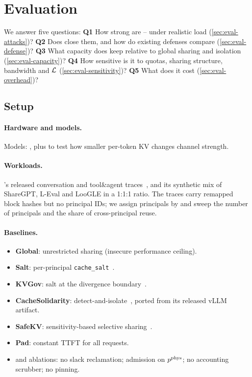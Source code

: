 \section{Evaluation}
\label{sec:eval}

We answer five questions:
\textbf{Q1} How strong are -- under realistic load (\cref{sec:eval-attacks})?
\textbf{Q2} Does \sys close them, and how do existing defenses compare (\cref{sec:eval-defense})?
\textbf{Q3} What capacity does \sys keep relative to global sharing and isolation (\cref{sec:eval-capacity})?
\textbf{Q4} How sensitive is it to quotas, sharing structure, bandwidth and $\mathcal{L}$ (\cref{sec:eval-sensitivity})?
\textbf{Q5} What does it cost (\cref{sec:eval-overhead})?

\subsection{Setup}
\paragraph{Hardware and models.}  Models:
,
plus  to test how smaller per-token KV changes channel strength.

\paragraph{Workloads.} \mc's released conversation and tool\&agent
traces~\cite{qin2025mooncake}, and its synthetic mix of ShareGPT, L-Eval and
LooGLE in a 1:1:1 ratio. The traces carry remapped block hashes but no
principal IDs; we assign principals by  and sweep the number of principals and the share of
cross-principal reuse. 

\paragraph{Baselines.}
\begin{itemize}
\item \textbf{Global}: unrestricted \mc sharing (insecure performance ceiling).
\item \textbf{Salt}: per-principal \texttt{cache\_salt}~\cite{vllmcachesalt}.
\item \textbf{KVGov}: salt at the divergence boundary~\cite{addagada2026kvgov}.
\item \textbf{CacheSolidarity}: detect-and-isolate~\cite{pennas2026cachesolidarity},
  ported from its released vLLM artifact.
\item \textbf{SafeKV}: sensitivity-based selective sharing~\cite{chu2025safekv}.
\item \textbf{Pad}: constant TTFT for all requests.
\item \textbf{\sys} and ablations: no slack reclamation; admission on $p^{\mathrm{phys}}$; no
  accounting scrubber; no pinning.
\end{itemize}

